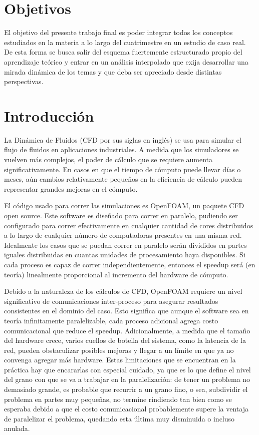 \documentclass{article}
\begin{document}
\section{Objetivos}
El objetivo del presente trabajo final es poder integrar todos los conceptos estudiados en la materia a lo largo del cuatrimestre en un estudio de caso real. De esta forma se busca salir del esquema fuertemente estructurado propio del aprendizaje teórico y entrar en un análisis interpolado que exija desarrollar una mirada dinámica de los temas y que deba ser apreciado desde distintas perspectivas.

\section{Introducción}

La Dinámica de Fluidos (CFD por sus siglas en inglés) se usa para simular el flujo de fluidos en aplicaciones industriales. A medida que los simuladores se vuelven más complejos, el poder de cálculo que se requiere aumenta significativamente. En casos en que el tiempo de cómputo puede llevar días o meses, aún cambios relativamente pequeños en la eficiencia de cálculo pueden representar grandes mejoras en el cómputo.

El código usado para correr las simulaciones es OpenFOAM, un paquete CFD open source. Este software es diseñado para correr en paralelo, pudiendo ser configurado para correr efectivamente en cualquier cantidad de cores distribuidos a lo largo de cualquier número de computadoras presentes en una misma red. Idealmente los casos que se puedan correr en paralelo serán divididos en partes iguales distribuidas en cuantas unidades de procesamiento haya disponibles. Si cada proceso es capaz de correr independientemente, entonces el speedup será (en teoría) linealmente proporcional al incremento del hardware de cómputo. 

Debido a la naturaleza de los cálculos de CFD, OpenFOAM requiere un nivel significativo de comunicaciones inter-proceso para asegurar resultados consistentes en el dominio del caso. Esto significa que aunque el software sea en teoría infinitamente paralelizable, cada proceso adicional agrega costo comunicacional que reduce el speedup. Adicionalmente, a medida que el tamaño del hardware crece, varios cuellos de botella del sistema, como la latencia de la red, pueden obstaculizar posibles mejoras y llegar a un límite en que ya no convenga agregar más hardware. Estas limitaciones que se encuentran en la práctica hay que encararlas con especial cuidado, ya que es lo que define el nivel del grano con que se va a trabajar en la paralelización: de tener un problema no demasiado grande, es probable que recurrir a un grano fino, o sea, subdividir el problema en partes muy pequeñas, no termine rindiendo tan bien como se esperaba debido a que el costo comunicacional probablemente supere la ventaja de paralelizar el problema, quedando esta última muy disminuida o incluso anulada. 
\end{document}
